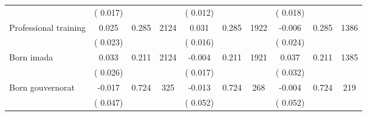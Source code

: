\begin{tabular}{l*{9}{c}}
                               &        (       0.017) & &                                                                 &       (       0.012) & &                                                          &       (       0.018) & &                                          \\ 
 Professional training                        &              0.025                &        0.285 & 2124                &              0.031 &        0.285 & 1922                       &       -0.006 &        0.285 & 1386                             \\ 
                               &        (       0.023) & &                                                                        &       (       0.016) & &                                                         &       (       0.024) & &                                         \\ 
 Born imada                        &              0.033                &        0.211 & 2124                &             -0.004 &        0.211 & 1921                       &        0.037 &        0.211 & 1385                             \\ 
                               &        (       0.026) & &                                                                        &       (       0.017) & &                                                         &       (       0.032) & &                                         \\ 
 Born gouvernorat                        &             -0.017                &        0.724 & 325                &             -0.013 &        0.724 & 268                       &       -0.004 &        0.724 & 219                             \\ 
                               &        (       0.047) & &                                                                        &       (       0.052) & &                                                         &       (       0.052) & &                                         \\ 
\hline \end{tabular}                                                                                                                                                      